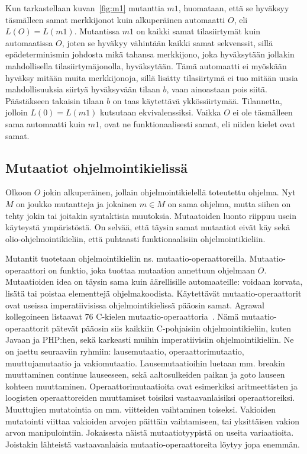 \documentclass{tktltiki}
\begin{document}
Kun tarkastellaan kuvan~\ref{fig:m1} mutanttia $m1$, huomataan, että se hyväksyy täsmälleen samat merkkijonot kuin alkuperäinen automaatti $O$, eli $L(O) = L(m1)$. Mutantissa $m1$ on kaikki samat tilasiirtymät kuin automaatissa $O$, joten se hyväkyy vähintään kaikki samat sekvenssit, sillä epädeterminismin johdosta mikä tahansa merkkijono, joka hyväksytään jollakin mahdollisella tilasiirtymäjonolla, hyväksytään. Tämä automaatti ei myöskään hyväksy mitään muita merkkijonoja, sillä lisätty tilasiirtymä ei tuo mitään uusia mahdollisuuksia siirtyä hyväksyvään tilaan $b$, vaan ainoastaan pois siitä. Päästäkseen takaisin tilaan $b$ on taas käytettävä ykkössiirtymää. Tilannetta, jolloin $L(0) = L(m1)$ kutsutaan ekvivalenssiksi. Vaikka $O$ ei ole täsmälleen sama automaatti kuin $m1$, ovat ne funktionaalisesti samat, eli niiden kielet ovat samat.
 
\subsection{Mutaatiot ohjelmointikielissä}
Olkoon $O$ jokin alkuperäinen, jollain ohjelmointikielellä toteutettu ohjelma. Nyt $M$ on joukko mutantteja ja jokainen $m\in M$ on sama ohjelma, mutta siihen on tehty jokin tai joitakin syntaktisia muutoksia. Mutaatoiden luonto riippuu usein käyteystä ympäristöstä. On selvää, että täysin samat mutaatiot eivät käy sekä olio-ohjelmointikieliin, että puhtaasti funktionaalisiin ohjelmointikieliin.

Mutantit tuotetaan ohjelmointikieliin ns. mutaatio-operaattoreilla. Mutaatio-operaattori on funktio, joka tuottaa mutaation annettuun ohjelmaan $O$. Mutaatioiden idea on täysin sama kuin äärellisille automaateille: voidaan korvata, lisätä tai poistaa elementtejä ohjelmakoodista. Käytettävät mutaatio-operaattorit ovat useissa imperatiivisissa ohjelmointikielissä pääosin samat. Agrawal kollegoineen listaavat 76 C-kielen mutaatio-operaattoria~\cite{AgrawalDHHHKMMS89}. Nämä mutaatio-operaattorit pätevät pääosin siis kaikkiin C-pohjaisiin ohjelmointikieliin, kuten Javaan ja PHP:hen, sekä karkeasti muihin imperatiivisiin ohjelmointikieliin. Ne on jaettu seuraaviin ryhmiin: lausemutaatio, operaattorimutaatio, muuttujamutaatio ja vakiomutaatio. Lausemutaatioihin luetaan mm. breakin muuttaminen continue lauseeseen, sekä aaltosulkeiden paikan ja goto lauseen kohteen muuttaminen. Operaattorimutaatioita ovat esimerkiksi aritmeettisten ja loogisten operaattoreiden muuttamiset toisiksi vastaavanlaisiksi operaattoreiksi. Muuttujien mutatointia on mm. viitteiden vaihtaminen toiseksi. Vakioiden mutatointi viittaa vakioiden arvojen päittäin vaihtamiseen, tai yksittäisen vakion arvon manipulointiin. Jokaisesta näistä mutaatiotyypistä on useita variaatioita. Joistakin lähteistä vastaavanlaisia mutaatio-operaattoreita löytyy jopa enemmän.
\end{document}
